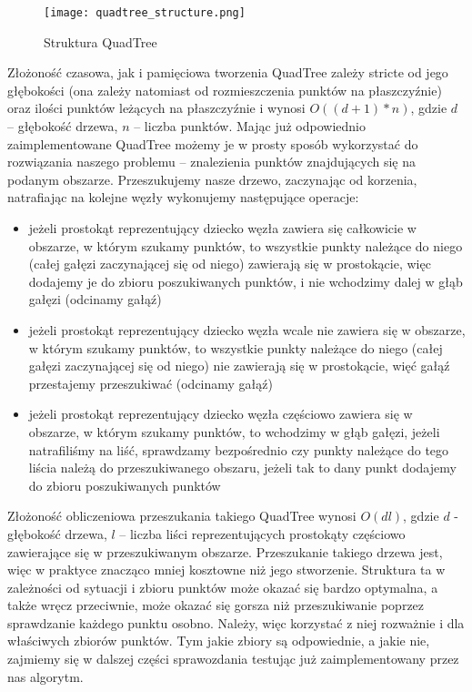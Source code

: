 \documentclass[a4paper, 12pt]{article}
\begin{document}
      \begin{figure}[h!]
      \centering
        \texttt{[image: quadtree\_structure.png]}
        \caption{Struktura QuadTree}
      \end{figure}

      \noindent
      \quad Złożoność czasowa, jak i pamięciowa tworzenia QuadTree zależy stricte od jego głębokości (ona zależy natomiast od rozmieszczenia punktów na płaszczyźnie) oraz ilości punktów leżących na płaszczyźnie i wynosi $O((d+1)*n)$, gdzie $d$ – głębokość drzewa, $n$ – liczba punktów. Mając już odpowiednio zaimplementowane QuadTree możemy je w prosty sposób wykorzystać do rozwiązania naszego problemu – znalezienia punktów znajdujących się na podanym obszarze. Przeszukujemy nasze drzewo, zaczynając od korzenia,  natrafiając na kolejne węzły wykonujemy następujące operacje: 

      \begin{itemize}
          \item jeżeli prostokąt reprezentujący dziecko węzła zawiera się całkowicie w obszarze, w którym szukamy punktów, to wszystkie punkty należące do niego (całej gałęzi zaczynającej się od niego) zawierają się w prostokącie, więc dodajemy je do zbioru poszukiwanych punktów, i nie wchodzimy dalej w głąb gałęzi (odcinamy gałąź) 
          \item jeżeli prostokąt reprezentujący dziecko węzła wcale nie zawiera się w obszarze, w którym szukamy punktów, to wszystkie punkty należące do niego (całej gałęzi zaczynającej się od niego) nie zawierają się w prostokącie, więć gałąź przestajemy przeszukiwać (odcinamy gałąź)
          \item jeżeli prostokąt reprezentujący dziecko węzła częściowo zawiera się w obszarze, w którym szukamy punktów, to wchodzimy w głąb gałęzi, jeżeli natrafiliśmy na liść, sprawdzamy bezpośrednio czy punkty należące do tego liścia należą do przeszukiwanego obszaru, jeżeli tak to dany punkt dodajemy do zbioru poszukiwanych punktów 
      \end{itemize}

      \noindent
      \quad Złożoność obliczeniowa przeszukania takiego QuadTree wynosi $O(dl)$, gdzie $d$ - głębokość drzewa, $l$ – liczba liści reprezentujących prostokąty częściowo zawierające się w przeszukiwanym obszarze. Przeszukanie takiego drzewa jest, więc w praktyce znacząco mniej kosztowne niż jego stworzenie. Struktura ta w zależności od sytuacji i zbioru punktów może okazać się bardzo optymalna, a także wręcz przeciwnie, może okazać się gorsza niż przeszukiwanie poprzez sprawdzanie każdego punktu osobno. Należy, więc korzystać z niej rozważnie i dla właściwych zbiorów punktów. Tym jakie zbiory są odpowiednie, a jakie nie, zajmiemy się w dalszej części sprawozdania testując już zaimplementowany przez nas algorytm. 
\end{document}

